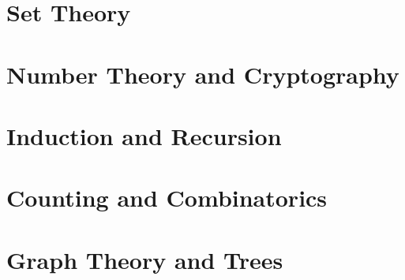 \documentclass{article}
\begin{document}
\section{Set Theory}




\section{Number Theory and Cryptography}

\section{Induction and Recursion}

\section{Counting and Combinatorics}

\section{Graph Theory and Trees}
\end{document}
